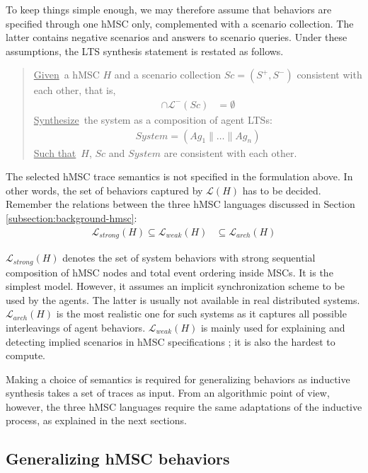 To keep things simple enough, we may therefore assume that behaviors are specified through one hMSC only, complemented with a scenario collection. The latter contains negative scenarios and answers to scenario queries. Under these assumptions, the LTS synthesis statement is restated as follows.

\begin{quote}
\underline{Given}~a hMSC $H$ and a scenario collection $Sc = (S^+,S^-)$ consistent with each other, that is,
\begin{align*}
[\mathcal{L}^+(Sc) \cup \mathcal{L}(H)] \cap \mathcal{L}^-(Sc) &= \emptyset
\end{align*}
\underline{Synthesize}~the system as a composition of agent LTSs:
\begin{align*}
System = (Ag_1 \parallel \ldots \parallel Ag_n)
\end{align*}
\underline{Such that}~$H$, $Sc$ and $System$ are consistent with each other.
\end{quote}

The selected hMSC trace semantics is not specified in the formulation above. In other words, the set of behaviors captured by $\mathcal{L}(H)$ has to be decided. Remember the relations between the three hMSC languages discussed in Section \ref{subsection:background-hmsc}: 
\begin{align}
\mathcal{L}_{strong}(H) \subseteq \mathcal{L}_{weak}(H) &\subseteq \mathcal{L}_{arch}(H)
\end{align}

$\mathcal{L}_{strong}(H)$ denotes the set of system behaviors with strong sequential composition of hMSC nodes and total event ordering inside MSCs. It is the simplest model. However, it assumes an implicit synchronization scheme to be used by the agents. The latter is usually not available in real distributed systems. $\mathcal{L}_{arch}(H)$ is the most realistic one for such systems as it captures all possible interleavings of agent behaviors. $\mathcal{L}_{weak}(H)$ is mainly used for explaining and detecting implied scenarios in hMSC specifications \cite{Uchitel:2003}; it is also the hardest to compute.

Making a choice of semantics is required for generalizing behaviors as inductive synthesis takes a set of traces as input. From an algorithmic point of view, however, the three hMSC languages require the same adaptations of the inductive process, as explained in the next sections.

\subsection{Generalizing hMSC behaviors\label{subsection:hmsc-induction-algo-adaptation}}

